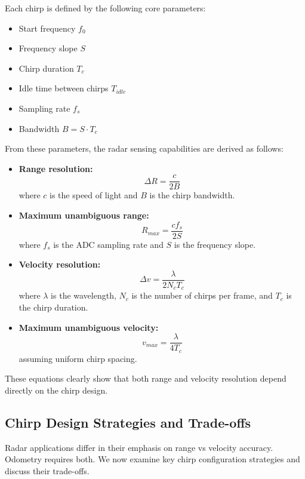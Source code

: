 Each chirp is defined by the following core parameters:
\begin{itemize}
    \item Start frequency $f_0$
    \item Frequency slope $S$
    \item Chirp duration $T_c$
    \item Idle time between chirps $T_{idle}$
    \item Sampling rate $f_s$
    \item Bandwidth $B = S \cdot T_c$
\end{itemize}

\hfill

From these parameters, the radar sensing capabilities are derived as follows:

\begin{itemize}
    \item \textbf{Range resolution:} 
    \[
        \Delta R = \frac{c}{2B}
    \]
    where $c$ is the speed of light and $B$ is the chirp bandwidth.

    \item \textbf{Maximum unambiguous range:} 
    \[
        R_{max} = \frac{c f_s}{2S}
    \]
    where $f_s$ is the ADC sampling rate and $S$ is the frequency slope.

    \item \textbf{Velocity resolution:} 
    \[
        \Delta v = \frac{\lambda}{2 N_c T_c}
    \]
    where $\lambda$ is the wavelength, $N_c$ is the number of chirps per frame, and $T_c$ is the chirp duration.

    \item \textbf{Maximum unambiguous velocity:} 
    \[
        v_{max} = \frac{\lambda}{4 T_c}
    \]
    assuming uniform chirp spacing.
\end{itemize}

These equations clearly show that both range and velocity resolution depend directly on the chirp design.

\vspace{1em}
\newpage

\subsection{Chirp Design Strategies and Trade-offs}
\label{sec:chirp-strategies}

Radar applications differ in their emphasis on range vs velocity accuracy.
Odometry requires both.
We now examine key chirp configuration strategies and discuss their trade-offs.
\vspace{1em}

